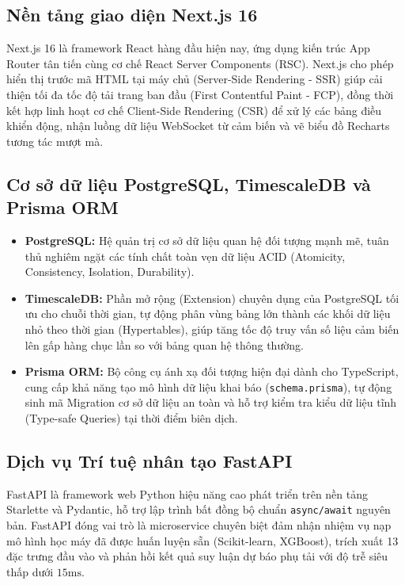 \subsection{Nền tảng giao diện Next.js 16}
Next.js 16 là framework React hàng đầu hiện nay, ứng dụng kiến trúc App Router tân tiến cùng cơ chế React Server Components (RSC). Next.js cho phép hiển thị trước mã HTML tại máy chủ (Server-Side Rendering - SSR) giúp cải thiện tối đa tốc độ tải trang ban đầu (First Contentful Paint - FCP), đồng thời kết hợp linh hoạt cơ chế Client-Side Rendering (CSR) để xử lý các bảng điều khiển động, nhận luồng dữ liệu WebSocket từ cảm biến và vẽ biểu đồ Recharts tương tác mượt mà.

\subsection{Cơ sở dữ liệu PostgreSQL, TimescaleDB và Prisma ORM}
\begin{itemize}
    \item \textbf{PostgreSQL:} Hệ quản trị cơ sở dữ liệu quan hệ đối tượng mạnh mẽ, tuân thủ nghiêm ngặt các tính chất toàn vẹn dữ liệu ACID (Atomicity, Consistency, Isolation, Durability).
    \item \textbf{TimescaleDB:} Phần mở rộng (Extension) chuyên dụng của PostgreSQL tối ưu cho chuỗi thời gian, tự động phân vùng bảng lớn thành các khối dữ liệu nhỏ theo thời gian (Hypertables), giúp tăng tốc độ truy vấn số liệu cảm biến lên gấp hàng chục lần so với bảng quan hệ thông thường.
    \item \textbf{Prisma ORM:} Bộ công cụ ánh xạ đối tượng hiện đại dành cho TypeScript, cung cấp khả năng tạo mô hình dữ liệu khai báo (\texttt{schema.prisma}), tự động sinh mã Migration cơ sở dữ liệu an toàn và hỗ trợ kiểm tra kiểu dữ liệu tĩnh (Type-safe Queries) tại thời điểm biên dịch.
\end{itemize}

\subsection{Dịch vụ Trí tuệ nhân tạo FastAPI}
FastAPI là framework web Python hiệu năng cao phát triển trên nền tảng Starlette và Pydantic, hỗ trợ lập trình bất đồng bộ chuẩn \texttt{async/await} nguyên bản. FastAPI đóng vai trò là microservice chuyên biệt đảm nhận nhiệm vụ nạp mô hình học máy đã được huấn luyện sẵn (Scikit-learn, XGBoost), trích xuất 13 đặc trưng đầu vào và phản hồi kết quả suy luận dự báo phụ tải với độ trễ siêu thấp dưới $15\text{ms}$.
\newpage
